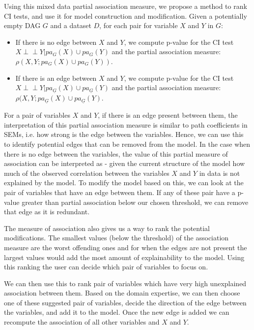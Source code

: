 \documentclass[letterpaper]{article} %
\def\ci{\perp\!\!\!\!\!\perp}
\begin{document}
Using this mixed data partial association measure, we propose a method to rank
CI tests, and use it for model construction and modification. Given a
potentially empty DAG $ G $ and a dataset $ D $, for each pair for variable $ X
$ and $ Y $ in $ G $:
\begin{itemize}
	\item If there is no edge between $ X $ and $ Y $, we compute p-value for the CI test $ X \ci Y \rvert pa_G(X) \cup pa_G(Y) $ and the partial association measure: $ \rho(X, Y; pa_G(X) \cup pa_G(Y)) $.
	\item If there is an edge between $ X $ and $ Y $, we compute p-value for the CI test $ X \ci Y \rvert pa_{\underline{G}}(X) \cup pa_{\underline{G}}(Y) $ and the partial association measure: $ \rho(X, Y; pa_{\underline{G}}(X) \cup pa_{\underline{G}}(Y) $.
\end{itemize}

For a pair of variables $ X $ and $ Y $, if there is an edge present between
them, the interpretation of this partial association measure is similar to path
coefficients in SEMs, i.e. how strong is the edge between the variables. Hence,
we can use this to identify potential edges that can be removed from the model.
In the case when there is no edge between the variables, the value of this
partial measure of association can be interpreted as - given the current
structure of the model how much of the observed correlation between the
variables $ X $ and $ Y $ in data is not explained by the model. To modify the
model based on this, we can look at the pair of variables that have an edge
between them. If any of these pair have a p-value greater than partial
association below our chosen threshold, we can remove that edge as it is
redundant.

The measure of association also gives us a way to rank the potential
modifications. The smallest values (below the threshold) of the association
measure are the worst offending ones and for when the edges are not present the
largest values would add the most amount of explainability to the model. Using
this ranking the user can decide which pair of variables to focus on.

We can then use this to rank pair of variables which have very high unexplained
association between them. Based on the domain expertise, we can then choose one
of these suggested pair of variables, decide the direction of the edge between
the variables, and add it to the model. Once the new edge is added we can
recompute the association of all other variables and $ X $ and $ Y $.
\end{document}
